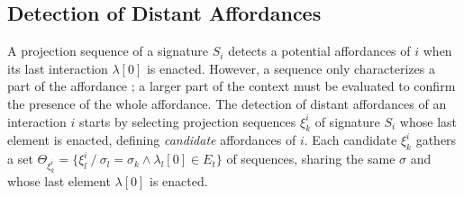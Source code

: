 \documentclass[conference]{IEEEtran}
\begin{document}





\subsection{Detection of Distant Affordances}\label{detection}



A projection sequence of a signature $S_i$ detects a potential affordances of $i$ when its last interaction $\lambda[0]$ is enacted. %
However, a sequence only characterizes a part of the affordance ; a larger part of the context must be evaluated to confirm the presence of the whole affordance.
The detection of distant affordances of an interaction $i$ starts by selecting projection sequences $\xi_k^i$ of signature $S_i$ whose last element is enacted, defining \textit{candidate} affordances of $i$. Each candidate $\xi_k^i$ gathers a set $\Theta_{\xi_k^i} = \{\xi_l^i ~/~ \sigma_l = \sigma_k \wedge \lambda_l[0] \in E_t\}$ of sequences, sharing the same $\sigma$ and whose last element $\lambda[0]$ is enacted. %
\end{document}
